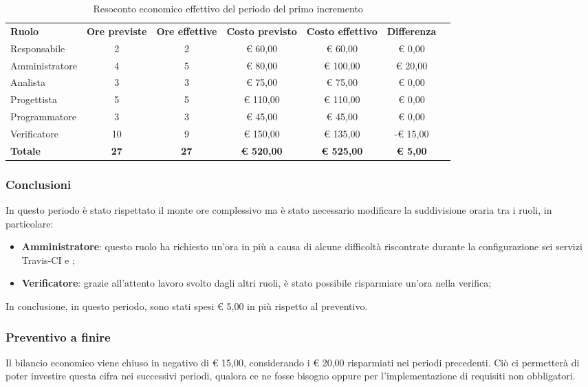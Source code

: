 \documentclass[../piano-di-progetto.tex]{subfiles}
\begin{document}
  \begin{table}[H]
    \centering
    \begin{tabular}{lcccccc}
      \rowcolor{lightgray}
      \textbf{Ruolo}  & \textbf{Ore previste} & \textbf{Ore effettive} & \textbf{Costo previsto} & \textbf{Costo effettivo} & \textbf{Differenza} \\
Responsabile    & 2           & 2           & € 60,00           & € 60,00           & € 0,00          \\
Amministratore  & 4           & 5           & € 80,00           & € 100,00          & € 20,00         \\
Analista        & 3           & 3           & € 75,00           & € 75,00           & € 0,00          \\
Progettista     & 5           & 5           & € 110,00          & € 110,00          & € 0,00          \\
Programmatore   & 3           & 3           & € 45,00           & € 45,00           & € 0,00          \\
Verificatore    & 10          & 9           & € 150,00          & € 135,00          & -€ 15,00        \\
\textbf{Totale} & \textbf{27} & \textbf{27} & \textbf{€ 520,00} & \textbf{€ 525,00} & \textbf{€ 5,00}

    \end{tabular}
    \caption{Resoconto economico effettivo del periodo del primo incremento}
  \end{table}


\subsubsection{Conclusioni}
In questo periodo è stato rispettato il monte ore complessivo ma è stato necessario modificare la suddivisione oraria tra i ruoli, in particolare:
\begin{itemize}
    \item \textbf{Amministratore}: questo ruolo ha richiesto un'ora in più a causa di alcune difficoltà riscontrate durante la configurazione sei servizi Travis-CI e ;
    \item \textbf{Verificatore}: grazie all'attento lavoro svolto dagli altri ruoli, è stato possibile risparmiare un'ora nella verifica;
\end{itemize}
In conclusione, in questo periodo, sono stati spesi € 5,00 in più rispetto al preventivo.
\subsubsection{Preventivo a finire}
Il bilancio economico viene chiuso in negativo di € 15,00, considerando i € 20,00 risparmiati nei periodi precedenti. Ciò ci permetterà di poter investire questa cifra nei successivi periodi, qualora ce ne fosse bisogno oppure per l'implementazione di requisiti non obbligatori.
\end{document}

